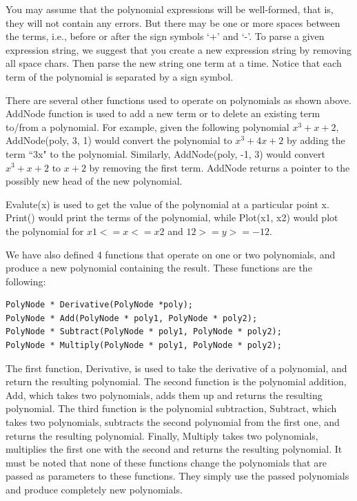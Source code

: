 \documentclass[10pt,dvipdfm]{article}
\begin{document}
You may assume that the polynomial expressions will be well-formed, that is, they will not contain any errors.
But there may be one or more spaces between the terms, i.e., before or after the sign symbols `+' and `-'.
To parse a given expression string, we suggest that you create a new expression string
by removing all space chars. Then parse the new string one term at a time. 
Notice that each term of the polynomial is separated by a sign symbol.

There are several other functions used to operate on polynomials as shown above.
AddNode function is used to add a new term or to delete an existing term to/from a polynomial.
For example, given the following polynomial $x^3+x+2$, AddNode(poly, 3, 1) would convert the polynomial to
$x^3+ 4x + 2$ by adding the term ``3x" to the polynomial. 
Similarly, AddNode(poly, -1, 3) would convert $x^3+x+2$ to $x+2$ by removing the first term.
AddNode returns a pointer to the possibly new head of the new polynomial.

Evalute(x) is used to get the value of the polynomial at a particular point x. Print() would print
the terms of the polynomial, while Plot(x1, x2) would plot the polynomial for $x1<=x<=x2$ and $12>=y>=-12$.

We have also defined 4 functions that operate on one or two
polynomials, and produce a new polynomial containing the result. These functions
are the following:

\begin{verbatim}
PolyNode * Derivative(PolyNode *poly);
PolyNode * Add(PolyNode * poly1, PolyNode * poly2);
PolyNode * Subtract(PolyNode * poly1, PolyNode * poly2);
PolyNode * Multiply(PolyNode * poly1, PolyNode * poly2);
\end{verbatim} 
%
The first function, Derivative, is used to take the derivative of a polynomial,
and return the resulting polynomial. The second function is the polynomial addition, Add,
which takes two polynomials, adds them up and returns the resulting polynomial.
The third function is the polynomial subtraction, Subtract,
which takes two polynomials, subtracts the second polynomial from the first one,
and returns the resulting polynomial. 
Finally, Multiply takes two polynomials, multiplies
the first one with the second and returns the resulting polynomial.
It must be noted that none of these functions change the polynomials that
are passed as parameters to these functions. They simply use the passed polynomials
and produce completely new polynomials.
\end{document}
